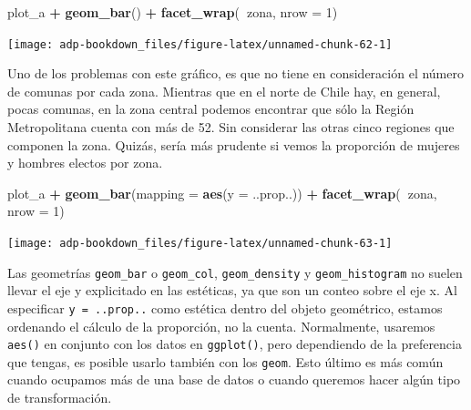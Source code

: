 \documentclass[]{book}
\newenvironment{Shaded}{\begin{snugshade}}{\end{snugshade}}
\newcommand{\DataTypeTok}[1]{\textcolor[rgb]{0.13,0.29,0.53}{#1}}
\newcommand{\DecValTok}[1]{\textcolor[rgb]{0.00,0.00,0.81}{#1}}
\newcommand{\KeywordTok}[1]{\textcolor[rgb]{0.13,0.29,0.53}{\textbf{#1}}}
\newcommand{\NormalTok}[1]{#1}
\newcommand{\OperatorTok}[1]{\textcolor[rgb]{0.81,0.36,0.00}{\textbf{#1}}}
\newcommand{\StringTok}[1]{\textcolor[rgb]{0.31,0.60,0.02}{#1}}
\begin{document}
\begin{Shaded}
\begin{Highlighting}[]
\NormalTok{plot_a }\OperatorTok{+}\StringTok{ }
\StringTok{  }\KeywordTok{geom_bar}\NormalTok{() }\OperatorTok{+}\StringTok{ }
\StringTok{  }\KeywordTok{facet_wrap}\NormalTok{(}\OperatorTok{~}\NormalTok{zona, }\DataTypeTok{nrow =} \DecValTok{1}\NormalTok{)}
\end{Highlighting}
\end{Shaded}

\begin{center}\texttt{[image: adp-bookdown\_files/figure-latex/unnamed-chunk-62-1]} \end{center}

Uno de los problemas con este gráfico, es que no tiene en consideración
el número de comunas por cada zona. Mientras que en el norte de Chile
hay, en general, pocas comunas, en la zona central podemos encontrar que
sólo la Región Metropolitana cuenta con más de 52. Sin considerar las
otras cinco regiones que componen la zona. Quizás, sería más prudente si
vemos la proporción de mujeres y hombres electos por zona.

\begin{Shaded}
\begin{Highlighting}[]
\NormalTok{plot_a }\OperatorTok{+}\StringTok{ }
\StringTok{  }\KeywordTok{geom_bar}\NormalTok{(}\DataTypeTok{mapping =} \KeywordTok{aes}\NormalTok{(}\DataTypeTok{y =}\NormalTok{ ..prop..)) }\OperatorTok{+}
\StringTok{  }\KeywordTok{facet_wrap}\NormalTok{(}\OperatorTok{~}\NormalTok{zona, }\DataTypeTok{nrow =} \DecValTok{1}\NormalTok{)}
\end{Highlighting}
\end{Shaded}

\begin{center}\texttt{[image: adp-bookdown\_files/figure-latex/unnamed-chunk-63-1]} \end{center}

Las geometrías \texttt{geom\_bar} o \texttt{geom\_col},
\texttt{geom\_density} y \texttt{geom\_histogram} no suelen llevar el
eje y explicitado en las estéticas, ya que son un conteo sobre el eje x.
Al especificar \texttt{y\ =\ ..prop..} como estética dentro del objeto
geométrico, estamos ordenando el cálculo de la proporción, no la cuenta.
Normalmente, usaremos \texttt{aes()} en conjunto con los datos en
\texttt{ggplot()}, pero dependiendo de la preferencia que tengas, es
posible usarlo también con los \texttt{geom}. Esto último es más común
cuando ocupamos más de una base de datos o cuando queremos hacer algún
tipo de transformación.
\end{document}
